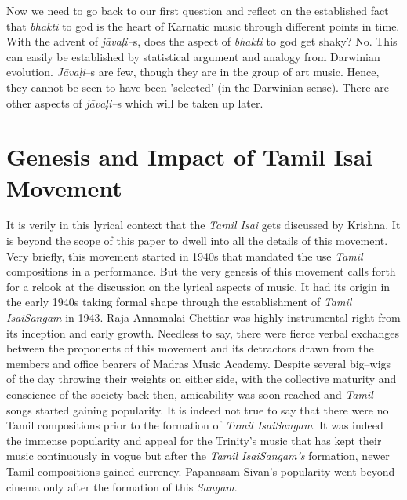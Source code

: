 Now we need to go back to our first question and reflect on the established fact that \textit{bhakti} to god is the heart of Karnatic music through different points in time. With the advent of \textit{jāvaḷi–}s, does the aspect of \textit{bhakti} to god get shaky? No. This can easily be established by statistical argument and analogy from Darwinian evolution. \textit{Jāvaḷi}–s are few, though they are in the group of art music. Hence, they cannot be seen to have been 'selected' (in the Darwinian sense). There are other aspects of \textit{jāvaḷi–}s which will be taken up later.

\vspace{-.2cm}

\section*{Genesis and Impact of Tamil Isai Movement}

\vspace{-.1cm}

It is verily in this lyrical context that the \textit{Tamil Isai} gets discussed by Krishna. It is beyond the scope of this paper to dwell into all the details of this movement. Very briefly, this movement started in 1940s that mandated the use \textit{Tamil} compositions in a performance. But the very genesis of this movement calls forth for a relook at the discussion on the lyrical aspects of music. It had its origin in the early 1940s taking formal shape through the establishment of \textit{Tamil IsaiSangam} in 1943. Raja Annamalai Chettiar was highly instrumental right from its inception and early growth. Needless to say, there were fierce verbal exchanges between the proponents of this movement and its detractors drawn from the members and office bearers of Madras Music Academy. Despite several big–wigs of the day throwing their weights on either side, with the collective maturity and conscience of the society back then, amicability was soon reached and \textit{Tamil} songs started gaining popularity. It is indeed not true to say that there were no Tamil compositions prior to the formation of \textit{Tamil IsaiSangam}. It was indeed the immense popularity and appeal for the Trinity’s music that has kept their music continuously in vogue but after the \textit{Tamil IsaiSangam’s} formation, newer Tamil compositions gained currency. Papanasam Sivan’s popularity went beyond cinema only after the formation of this \textit{Sangam}.

